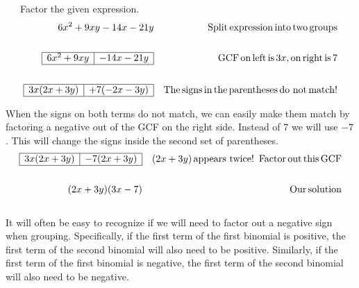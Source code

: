\begin{example}~~~Factor the given expression.
  \begin{eqnarray*}
    6 x^2 + 9 x y - 14 x - 21 y &  & \operatorname{Split} \operatorname{expression} \operatorname{into}
    \operatorname{two} \operatorname{groups}\\
&&\\
    \begin{array}{|l|l|}
      \hline
      6 x^2 + 9 x y & - 14 x - 21 y\\
      \hline
    \end{array} &  & \operatorname{GCF} \operatorname{on} \operatorname{left} \operatorname{is} 3 x, \operatorname{on}
    \operatorname{right} \operatorname{is} 7\\
&&\\
    \begin{array}{|l|l|}
      \hline
      3 x (2 x + 3 y) & + 7 (- 2 x - 3 y)\\
      \hline
    \end{array} &  & \operatorname{The} \operatorname{signs} \operatorname{in} \operatorname{the}
    \operatorname{parentheses} \operatorname{do~not} \operatorname{match} !
  \end{eqnarray*}
\end{example}
  
When the signs on both terms do not match, we can easily make them match by
  factoring a negative out of the GCF on the right side. Instead of $7$ we will
  use $- 7$. This will change the signs inside the second set of parentheses.
  \begin{eqnarray*}
    \begin{array}{|l|l|}
      \hline
      3 x (2 x + 3 y) & - 7 (2 x + 3 y)\\
      \hline
    \end{array} &  & (2 x + 3 y) \operatorname{appears~twice} !
    \operatorname{~Factor} \operatorname{out} \operatorname{this} \operatorname{GCF}\\
&&\\
    (2 x + 3 y) (3 x - 7) &  & \operatorname{Our} \operatorname{solution}
  \end{eqnarray*}
~\\
It will often be easy to recognize if we will need to factor out a negative sign when
grouping. Specifically, if the first term of the first binomial is positive, the first term of the second binomial will also need to be positive. Similarly, if the first term of the first binomial is negative, the first term of the second binomial will also need to be negative.

